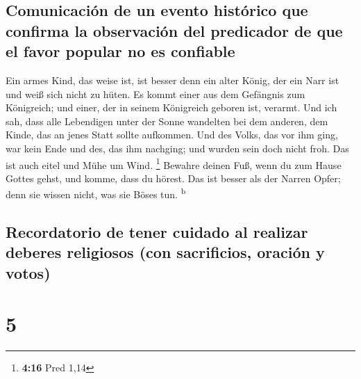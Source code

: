 \hypertarget{comunicaciuxf3n-de-un-evento-histuxf3rico-que-confirma-la-observaciuxf3n-del-predicador-de-que-el-favor-popular-no-es-confiable}{%
\subsection{Comunicación de un evento histórico que confirma la
observación del predicador de que el favor popular no es
confiable}\label{comunicaciuxf3n-de-un-evento-histuxf3rico-que-confirma-la-observaciuxf3n-del-predicador-de-que-el-favor-popular-no-es-confiable}}

 Ein armes Kind, das weise ist, ist besser denn ein alter
König, der ein Narr ist und weiß sich nicht zu hüten.  Es
kommt einer aus dem Gefängnis zum Königreich; und einer, der in seinem
Königreich geboren ist, verarmt.  Und ich sah, dass alle
Lebendigen unter der Sonne wandelten bei dem anderen, dem Kinde, das an
jenes Statt sollte aufkommen.  Und des Volks, das vor ihm
ging, war kein Ende und des, das ihm nachging; und wurden sein doch
nicht froh. Das ist auch eitel und Mühe um Wind. \footnote{\textbf{4:16}
  Pred 1,14}  Bewahre deinen Fuß, wenn du zum Hause
Gottes gehst, und komme, dass du hörest. Das ist besser als der Narren
Opfer; denn sie wissen nicht, was sie Böses tun. \textsuperscript{b}

\hypertarget{recordatorio-de-tener-cuidado-al-realizar-deberes-religiosos-con-sacrificios-oraciuxf3n-y-votos}{%
\subsection{Recordatorio de tener cuidado al realizar deberes religiosos
(con sacrificios, oración y
votos)}\label{recordatorio-de-tener-cuidado-al-realizar-deberes-religiosos-con-sacrificios-oraciuxf3n-y-votos}}

\hypertarget{section-4}{%
\section{5}\label{section-4}}

